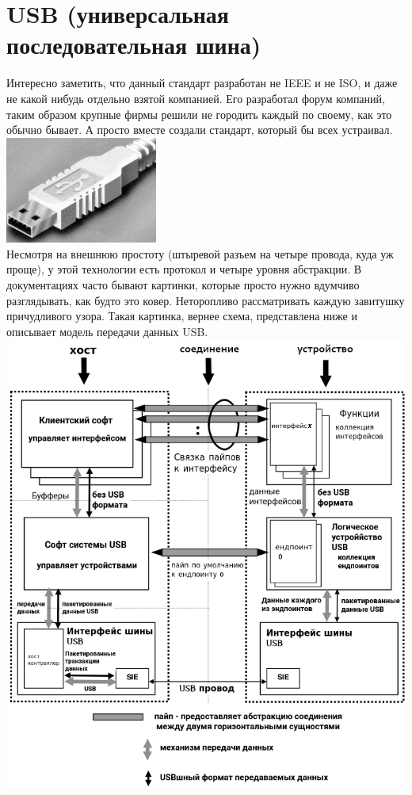 \documentclass[12pt,a4paper]{article}
\begin{document}
\section{USB (универсальная последовательная шина)}
    Интересно заметить, что данный стандарт разработан не IEEE и не ISO, и
    даже не какой нибудь отдельно взятой компанией. Его разработал форум
    компаний, таким образом крупные фирмы решили не городить каждый по своему,
    как это обычно бывает. А просто вместе создали стандарт, который
    бы всех устраивал.\\
\includegraphics[width=5cm]{plug.png}\\
    Несмотря на внешнюю простоту (штыревой разъем на четыре провода, куда уж
    проще), у этой технологии есть протокол и четыре уровня абстракции.
    В документациях часто бывают картинки, которые просто нужно вдумчиво
    разглядывать, как будто это ковер. Неторопливо рассматривать каждую
    завитушку причудливого узора. Такая картинка, вернее схема, представлена
    ниже и описывает модель передачи данных USB.\\
\includegraphics[width=15cm]{protocol.png}\\
\end{document}
